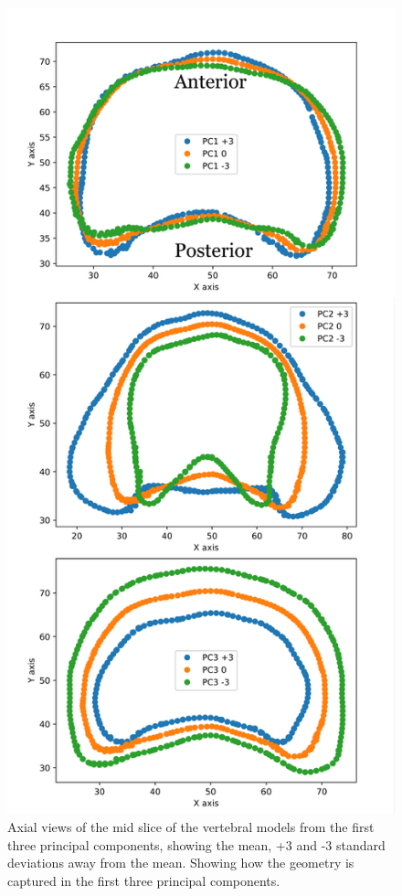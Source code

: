 \begin{figure}[p]
  \centering
  \includegraphics[width=.65\textwidth]{Chapters/Chapter_PCA_images/PC1_2_3_AxialSlice.pdf}
  \caption{Axial views of the mid slice of the vertebral models from the first three principal components, showing the mean, +3 and -3 standard deviations away from the mean. Showing how the geometry is captured in the first three principal components.}
  \label{fig:PC1_2_3_AxialSlice}
\end{figure}

